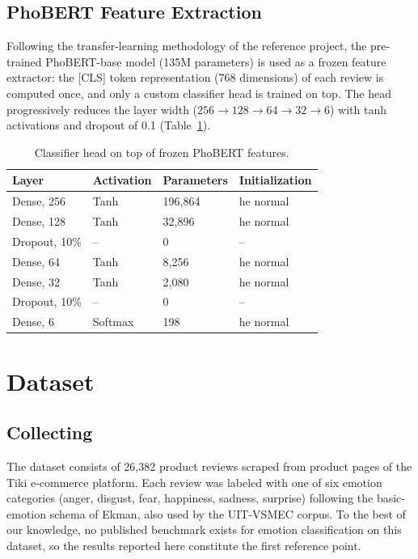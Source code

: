 \documentclass[11pt]{article}
\begin{document}
\subsection{PhoBERT Feature Extraction}
Following the transfer-learning methodology of the reference project, the pre-trained PhoBERT-base model (135M parameters) is used as a frozen feature extractor: the [CLS] token representation (768 dimensions) of each review is computed once, and only a custom classifier head is trained on top. The head progressively reduces the layer width ($256\to128\to64\to32\to6$) with tanh activations and dropout of 0.1 (Table~\ref{tab:phoberthead}).

\begin{table}[h]
\centering
\caption{Classifier head on top of frozen PhoBERT features.}
\label{tab:phoberthead}
\begin{tabular}{llll}
\hline
Layer & Activation & Parameters & Initialization \\
\hline
Dense, 256 & Tanh & 196,864 & he normal \\
Dense, 128 & Tanh & 32,896 & he normal \\
Dropout, 10\% & -- & 0 & -- \\
Dense, 64 & Tanh & 8,256 & he normal \\
Dense, 32 & Tanh & 2,080 & he normal \\
Dropout, 10\% & -- & 0 & -- \\
Dense, 6 & Softmax & 198 & he normal \\
\hline
\end{tabular}
\end{table}

\section{Dataset}
\subsection{Collecting}
The dataset consists of 26,382 product reviews scraped from product pages of the Tiki e-commerce platform. Each review was labeled with one of six emotion categories (anger, disgust, fear, happiness, sadness, surprise) following the basic-emotion schema of Ekman, also used by the UIT-VSMEC corpus. To the best of our knowledge, no published benchmark exists for emotion classification on this dataset, so the results reported here constitute the first reference point.
\end{document}
